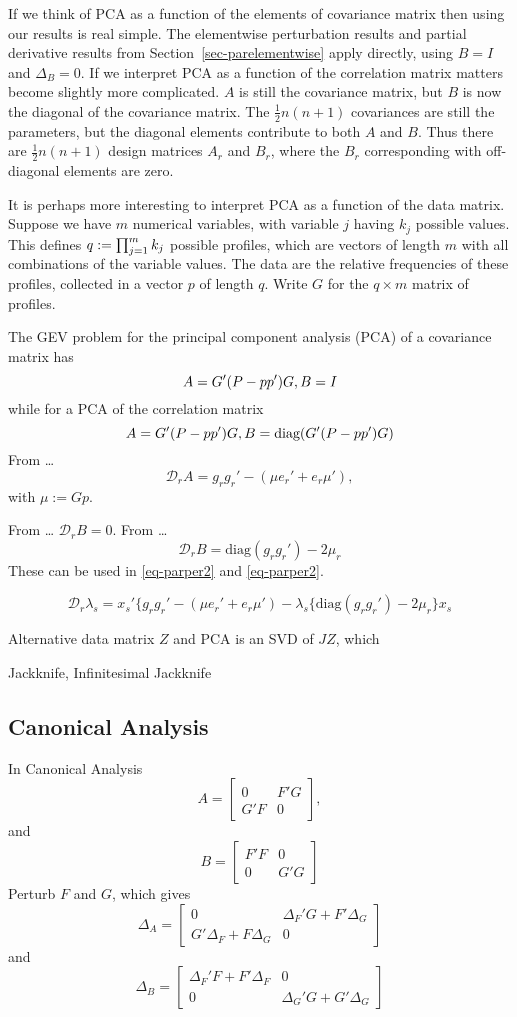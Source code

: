 \documentclass[
  12pt,
  letterpaper,
  DIV=11,
  numbers=noendperiod]{scrartcl}
\begin{document}
If we think of PCA as a function of the elements of covariance matrix
then using our results is real simple. The elementwise perturbation
results and partial derivative results from
Section~\ref{sec-parelementwise} apply directly, using \(B=I\) and
\(\Delta_B=0\). If we interpret PCA as a function of the correlation
matrix matters become slightly more complicated. \(A\) is still the
covariance matrix, but \(B\) is now the diagonal of the covariance
matrix. The \(\frac12n(n+1)\) covariances are still the parameters, but
the diagonal elements contribute to both \(A\) and \(B\). Thus there are
\(\frac12n(n+1)\) design matrices \(A_r\) and \(B_r\), where the \(B_r\)
corresponding with off-diagonal elements are zero.

It is perhaps more interesting to interpret PCA as a function of the
data matrix. Suppose we have \(m\) numerical variables, with variable
\(j\) having \(k_j\) possible values. This defines
\(q:=\smash{\prod_{j=1}^m k_j}\) possible profiles, which are vectors of
length \(m\) with all combinations of the variable values. The data are
the relative frequencies of these profiles, collected in a vector \(p\)
of length \(q\). Write \(G\) for the \(q\times m\) matrix of profiles.

The GEV problem for the principal component analysis (PCA) of a
covariance matrix has \[
A=G'(P-pp')G,\\
B=I
\] while for a PCA of the correlation matrix \[
A=G'(P-pp')G,\\
B=\text{diag}(G'(P-pp')G)
\] From \ldots{}\\
\[
\mathcal{D}_rA=g_rg_r'-(\mu e_r'+e_r\mu'),
\] with \(\mu:=Gp\).

From \ldots{} \(\mathcal{D}_rB=0\). From \ldots{} \[
\mathcal{D}_rB=\text{diag}(g_rg_r')-2\mu_r
\] These can be used in \eqref{eq-parper2} and \eqref{eq-parper2}.

\[
\mathcal{D}_r\lambda_s=
x_s'\{g_rg_r'-(\mu e_r'+e_r\mu')-\lambda_s\{\text{diag}(g_rg_r')-2\mu_r\}x_s
\]

Alternative data matrix \(Z\) and PCA is an SVD of \(JZ\), which

Jackknife, Infinitesimal Jackknife

\subsection{Canonical Analysis}\label{sec-canonical}

In Canonical Analysis \[
A=\begin{bmatrix}
0&F'G\\
G'F&0
\end{bmatrix},
\] and \[
B=\begin{bmatrix}
F'F&0\\
0&G'G
\end{bmatrix}
\] Perturb \(F\) and \(G\), which gives \[
\Delta_A=\begin{bmatrix}
0&\Delta_F'G+F'\Delta_G\\
G'\Delta_F+F\Delta_G&0
\end{bmatrix}
\] and \[
\Delta_B=\begin{bmatrix}
\Delta_F'F+F'\Delta_F&0\\
0&\Delta_G'G+G'\Delta_G
\end{bmatrix}
\]
\end{document}
